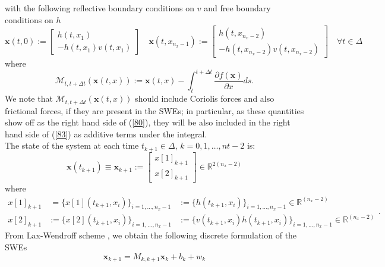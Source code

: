 \documentclass[smallcondensed]{svjour3}
\begin{document}
with the following reflective boundary conditions on $v$ and free boundary conditions on $h$
\begin{equation}\label{boundary_cond}
\textbf{x}(t,0):=\left[\begin{array}{ll}h(t,x_{1})\\
-h(t,x_{1})v(t,x_{1})
\end{array}\right]\quad
\textbf{x}(t,x_{n_{x}-1}):=\left[\begin{array}{ll}h(t,x_{n_{x}-2})\\
-h(t,x_{n_{x}-2})v(t,x_{n_{x}-2})
\end{array}\right] \quad \forall t\in \Delta
\end{equation} 
where
\begin{equation}\label{83}
\mathcal{M}_{t,t+\Delta t}(\textbf{x}(t,x)):=\textbf{x}(t,x)-\int_{t}^{t+\Delta t} \frac{\partial f(\textbf{x})}{\partial x} ds.
\end{equation}
We note that  $\mathcal{M}_{t,t+\Delta t}(\textbf{x}(t,x))$ should include Coriolis forces and also frictional forces, if they are present in the SWEs; in particular, as these quantities  show off as the right hand side of (\ref{80}), they will be also included in the right hand side of (\ref{83}) as additive terms under  the integral. \\ 
The state of the system at each time $t_{k+1}\in \Delta$, $k=0,1,\ldots,nt-2$ is:
\begin{equation}
\textbf{x}(t_{k+1})\equiv \textbf{x}_{k+1}:=\left[\begin{array}{lll}
x[1]_{k+1}\\
x[2]_{k+1}  
\end{array}\right]\in \mathbb{R}^{2(n_{x}-2)}
\end{equation}
where
\begin{equation}
 \begin{array}{lll}
  x[1]_{k+1}&\:= \{x[1](t_{k+1},x_{i})\}_{i=1,\ldots,n_{x}-1} &:=\{h(t_{k+1},x_{i})\}_{i=1,\ldots,n_{x}-1} \in \mathbb{R}^{(n_{x}-2)} \\ x[2]_{k+1}&:= \{x[2](t_{k+1},x_{i})\}_{i=1,\ldots,n_{x}-1}&:=\{v(t_{k+1},x_{i})h(t_{k+1},x_{i})\}_{i=1,\ldots,n_{x}-1} \in \mathbb{R}^{(n_{x}-2)} 
 \end{array}.
 \end{equation}
\noindent From  Lax-Wendroff scheme \cite{LeVeque}, we obtain the following discrete formulation of the SWEs
\begin{equation}\label{modello_swes}
\textbf{x}_{k+1}=M_{k,k+1}\textbf{x}_{k}+b_{k}+w_{k}
\end{equation}
\end{document}

